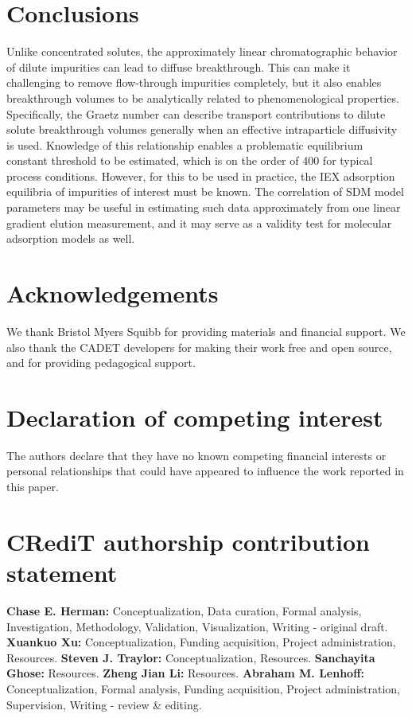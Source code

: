 \documentclass[preprint,review,12pt]{elsarticle}
\begin{document}
\section{Conclusions} \label{sec:concl}

    Unlike concentrated solutes, the approximately linear chromatographic behavior of dilute impurities can lead to diffuse breakthrough. This can make it challenging to remove flow-through impurities completely, but it also enables breakthrough volumes to be analytically related to phenomenological properties. Specifically, the Graetz number can describe transport contributions to dilute solute breakthrough volumes generally when an effective intraparticle diffusivity is used. Knowledge of this relationship enables a problematic equilibrium constant threshold to be estimated, which is on the order of 400 for typical process conditions. However, for this to be used in practice, the IEX adsorption equilibria of impurities of interest must be known. The correlation of SDM model parameters may be useful in estimating such data approximately from one linear gradient elution measurement, and it may serve as a validity test for molecular adsorption models as well.


\section*{Acknowledgements}
    We thank Bristol Myers Squibb for providing materials and financial support. We also thank the CADET developers for making their work free and open source, and for providing pedagogical support.

\section*{Declaration of competing interest}
    The authors declare that they have no known competing financial interests or personal relationships that could have appeared to influence the work reported in this paper.

\section*{CRediT authorship contribution statement}
    \textbf{Chase E. Herman:} Conceptualization, Data curation, Formal analysis, Investigation, Methodology, Validation, Visualization, Writing - original draft.
    \textbf{Xuankuo Xu:} Conceptualization, Funding acquisition, Project administration, Resources.
    \textbf{Steven J. Traylor:} Conceptualization, Resources.
    \textbf{Sanchayita Ghose:} Resources.
    \textbf{Zheng Jian Li:} Resources.
    \textbf{Abraham M. Lenhoff:} Conceptualization, Formal analysis, Funding acquisition, Project administration, Supervision, Writing - review \& editing.
\end{document}
